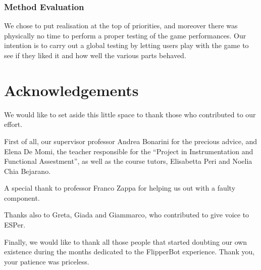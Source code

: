 \documentclass[a4paper,twoside]{book}
\begin{document}
\subsection*{Method Evaluation}

We chose to put realisation at the top of priorities, and moreover there was physically no time to perform a proper testing of the game performances. Our intention is to carry out a global testing by letting users play with the game to see if they liked it and how well the various parts behaved.


\chapter{Acknowledgements}

We would like to set aside this little space to thank those who contributed to our effort.

First of all, our supervisor professor Andrea Bonarini for the precious advice, and Elena De Momi, the teacher responsible for the \textquotedblleft{}Project in Instrumentation and Functional Assestment\textquotedblright{}, as well as the course tutors, Elisabetta Peri and Noelia Chia Bejarano.


A special thank to professor Franco Zappa for helping us out with a faulty component.

Thanks also to Greta, Giada and Giammarco, who contributed to give voice to ESPer.

Finally, we would like to thank all those people that started doubting our own existence during the months dedicated to the FlipperBot experience. Thank you, your patience was priceless.
\end{document}
